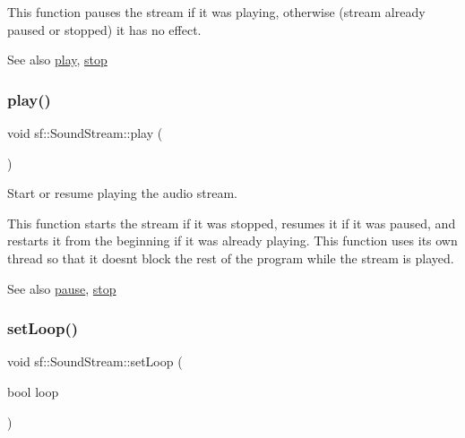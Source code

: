 This function pauses the stream if it was playing, otherwise (stream already paused or stopped) it has no effect.

\begin{DoxySeeAlso}{See also}
\hyperlink{classsf_1_1_sound_stream_afdc08b69cab5f243d9324940a85a1144}{play}, \hyperlink{classsf_1_1_sound_stream_a16cc6a0404b32e42c4dce184bb94d0f4}{stop} 
\end{DoxySeeAlso}
\mbox{\label{classsf_1_1_sound_stream_afdc08b69cab5f243d9324940a85a1144}} 
\subsubsection{\texorpdfstring{play()}{play()}}
{\footnotesize\ttfamily void sf\+::\+Sound\+Stream\+::play (\begin{DoxyParamCaption}{ }\end{DoxyParamCaption})}



Start or resume playing the audio stream. 

This function starts the stream if it was stopped, resumes it if it was paused, and restarts it from the beginning if it was already playing. This function uses its own thread so that it doesn\textquotesingle{}t block the rest of the program while the stream is played.

\begin{DoxySeeAlso}{See also}
\hyperlink{classsf_1_1_sound_stream_a932ff181e661503cad288b4bb6fe45ca}{pause}, \hyperlink{classsf_1_1_sound_stream_a16cc6a0404b32e42c4dce184bb94d0f4}{stop} 
\end{DoxySeeAlso}
\mbox{\label{classsf_1_1_sound_stream_a43fade018ffba7e4f847a9f00b353f3d}} 
\subsubsection{\texorpdfstring{set\+Loop()}{setLoop()}}
{\footnotesize\ttfamily void sf\+::\+Sound\+Stream\+::set\+Loop (\begin{DoxyParamCaption}\item[{bool}]{loop }\end{DoxyParamCaption})}



